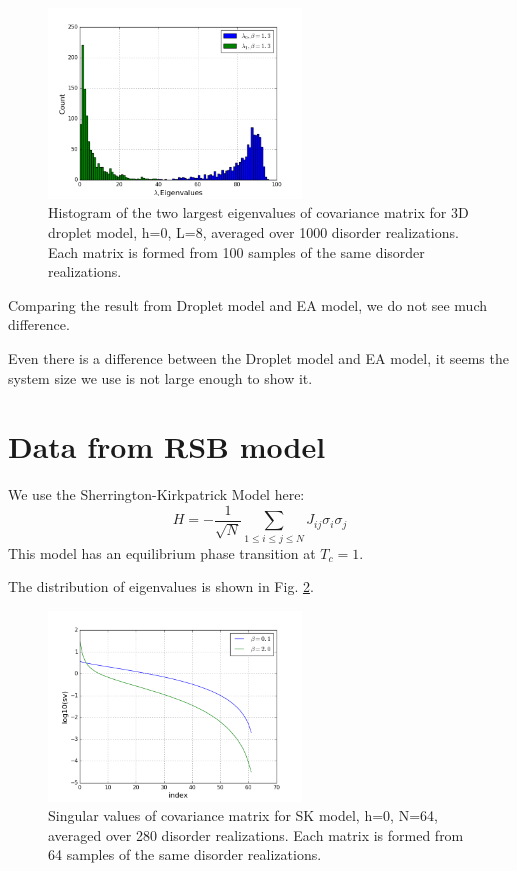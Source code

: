 \begin{figure}[ht]
  \centering
  \includegraphics[width=0.6\textwidth]{img/matrix/eigDropletDist.png}
  \caption{Histogram of the two largest eigenvalues of covariance matrix for 3D droplet model, h=0, L=8, 
averaged over 1000 disorder realizations. 
Each matrix is formed from 100 samples of the same disorder realizations.}
  \label{fig:eigDropletDist}
\end{figure}

Comparing the result from Droplet model and EA model, we do not see much difference.

Even there is a difference between the Droplet model and EA model, it seems 
the system size we use is not large enough to show it.

\section{Data from RSB model }
We use the Sherrington-Kirkpatrick Model here:
\[
H=-\frac{1}{\sqrt{N}}\sum_{1\le i \le j \le N} J_{ij}\sigma_i\sigma_j
\]
This model has an equilibrium phase transition at $T_c=1$. 


The distribution of eigenvalues is shown in Fig. \ref{fig:eigRSB}.

\begin{figure}[ht]
  \centering
  \includegraphics[width=0.6\textwidth]{img/matrix/svdDistRSB.png}
  \caption{Singular values of covariance matrix for SK model, h=0, N=64, 
averaged over 280 disorder realizations. 
Each matrix is formed from 64 samples of the same disorder realizations.}
  \label{fig:eigRSB}
\end{figure}

